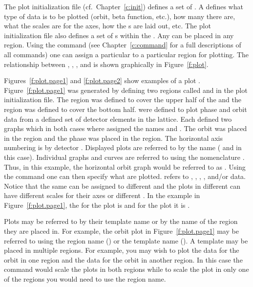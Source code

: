 The plot initialization file (cf.~Chapter~\ref{c:init}) defines a set
of . A  defines what type of data is
to be plotted (orbit, beta function, etc.), how many  there are,
what the scales are for the  axes, how the s are
laid out, etc.  The plot initialization file also defines a set of
s within the . Any  can be
placed in any region. Using the  command (see
Chapter~\ref{c:command} for a full descriptions of all commands) one
can assign a particular  to a particular region for
plotting.  The relationship between , ,
, and  is shown graphically in
Figure~\ref{f:plot}.

Figures~\ref{f:plot.page1} and \ref{f:plot.page2} show examples of a
plot . Figure~\ref{f:plot.page1} was generated by defining
two regions called  and  in the plot initialization
file. The  region was defined to cover the upper half of the
 and the  region was defined to cover the bottom
half.  were defined to plot phase and orbit data
from a defined set of detector elements in the lattice. Each
 defined two graphs which in both cases where
assigned the names  and . The orbit  was
placed in the  region and the phase  was
placed in the  region. The horizontal axis numbering is by
detector .  Displayed plots are referred to by the
 name ( and  in this case). Individual
graphs and curves are referred to using the nomenclature
. Thus, in this example, the horizontal orbit
graph would be referred to as .  Using the  command
one can then specify what  are plotted. 
refers to , , , , and/or
 data.  Notice that the same  can be
assigned to different  and the plots in different
 can have different scales for their axes or different
. In the example in Figure~\ref{f:plot.page1}, the
 for the  plot is  and for the
 plot it is .

Plots may be referred to by their template name or by the name of the
region they are placed in. For example, the orbit plot in
Figure~\ref{f:plot.page1} may be referred to using the region name
() or the template name (). A template may be placed
in multiple regions.  For example, you may wish to plot the 
data for the orbit in one region and the  data for the
orbit in another region. In this case the command 
would scale the plots in both regions while to scale the plot in only
one of the regions you would need to use the region name. 

